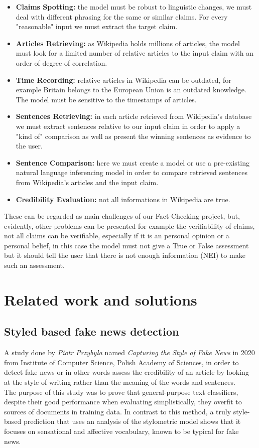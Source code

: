 \documentclass[10pt, english]{report}
\begin{document}
\begin{itemize}
	\item \textbf{Claims Spotting:} the model must be robust to linguistic changes, we must deal with different phrasing for the same or similar claims. For every "reasonable" input we must extract the target claim.
	\item \textbf{Articles Retrieving:} as Wikipedia holds millions of articles, the model must look for a limited number of relative articles to the input claim with an order of degree of correlation.
	\item \textbf{Time Recording:} relative articles in Wikipedia can be outdated, for example Britain belongs to the European Union is an outdated knowledge. The model must be sensitive to the timestamps of articles.
	\item \textbf{Sentences Retrieving:}  in each article retrieved from Wikipedia's database we must extract sentences relative to our input claim in order to apply a "kind of" comparison as well as present the winning sentences as evidence to the user.
	\item \textbf{Sentence Comparison:} here we must create a model or use a pre-existing natural language inferencing model in order to compare retrieved sentences from Wikipedia's articles and the input claim. 
	\item \textbf{Credibility Evaluation:} not all informations in Wikipedia are true.
\end{itemize}

These can be regarded as main challenges of our Fact-Checking project, but, evidently, other problems can be presented for example the verifiability of claims, not all claims can be verifiable, especially if it is an personal opinion or a personal belief, in this case the model must not give a True or False assessment but it should tell the user that there is not enough information (NEI) to make such an assessment.

\section{Related work and solutions}
\subsection{Styled based fake news detection}
A study done by \textit{Piotr Przybyła} named \textit{Capturing the Style of Fake News} in 2020 from Institute of Computer Science, Polish Academy of Sciences, in order to detect fake news or in other words assess the credibility of an article by looking at the style of writing rather than the meaning of the words and sentences.\\
The purpose of this study was to prove that general-purpose text classifiers, despite their good performance when evaluating simplistically, they overfit to sources of documents in training data. In contrast to this method, a truly style-based prediction that uses an analysis of the stylometric model shows that it focuses on sensational and affective vocabulary, known to be typical for fake news.\\
\end{document}

